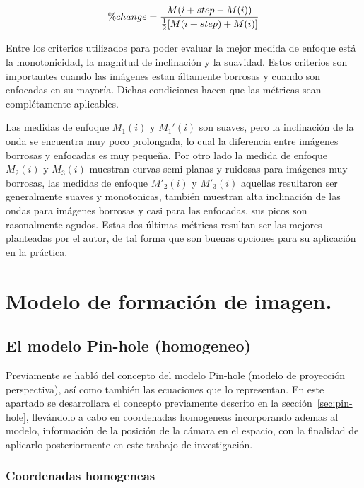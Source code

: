 \begin{equation} \label{eqn:percentChange}
\large \% change = \frac{M(i+step - M(i))}{\frac{1}{2}[M(i+step)+M(i)]}
\end{equation}

Entre los criterios utilizados para poder evaluar la mejor medida de enfoque está la monotonicidad, la magnitud de inclinación y la suavidad. Estos criterios son importantes cuando las imágenes estan áltamente borrosas y cuando son enfocadas en su mayoría. Dichas condiciones hacen que las métricas sean complétamente aplicables. 

Las medidas de enfoque $M_1(i)$ y $M_1'(i)$ son suaves, pero la inclinación de la onda se encuentra muy poco prolongada, lo cual la diferencia entre imágenes borrosas y enfocadas es muy pequeña. Por otro lado la medida de enfoque $M_2(i)$ y $M_3(i)$ muestran curvas semi-planas y ruidosas para imágenes muy borrosas, las medidas de enfoque $M'_2(i)$ y $M'_3(i)$ aquellas resultaron ser generalmente suaves y monotonicas, también muestran alta inclinación de las ondas para imágenes borrosas y casi para las enfocadas, sus picos son rasonalmente agudos. Estas dos últimas métricas resultan ser las mejores planteadas por el autor, de tal forma que son buenas opciones para su aplicación en la práctica.

\section{Modelo de formación de imagen.}




\subsection{El modelo Pin-hole  (homogeneo)}

Previamente se habló del concepto del modelo Pin-hole (modelo de proyección perspectiva), así como también las ecuaciones que lo representan. En este apartado se desarrollara el concepto previamente descrito en la sección~\ref{sec:pin-hole}, llevándolo a cabo en coordenadas homogeneas incorporando ademas al modelo, información de la posición de la cámara en el espacio, con la finalidad de aplicarlo posteriormente en este trabajo de investigación.

\subsubsection{Coordenadas homogeneas \label{coordenadashomogentitle}}

